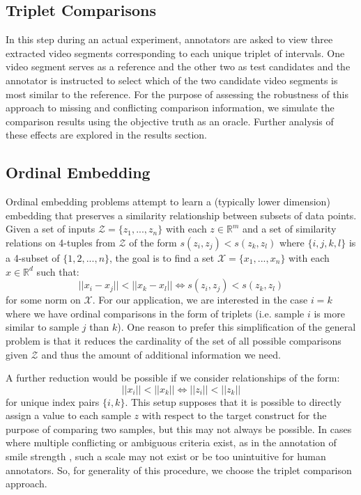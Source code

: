 \documentclass[times,twocolumn,final,authoryear]{elsarticle}
\begin{document}
\subsection{Triplet Comparisons}
In this step during an actual experiment, annotators are asked to view three extracted video segments corresponding to each unique triplet of intervals.  One video segment serves as a reference and the other two as test candidates and the annotator is instructed to select which of the two candidate video segments is most similar to the reference.  For the purpose of assessing the robustness of this approach to missing and conflicting comparison information, we simulate the comparison results using the objective truth as an oracle.  Further analysis of these effects are explored in the results section.

\subsection{Ordinal Embedding}
Ordinal embedding problems attempt to learn a (typically lower dimension) embedding that preserves a similarity relationship between subsets of data points.  Given a set of inputs $\mathcal{Z} = \{z_1,...,z_n\}$ with each $z \in \mathbb{R}^m$ and a set of similarity relations on 4-tuples from $\mathcal{Z}$ of the form $s(z_i,z_j) < s(z_k,z_l)$ where $\{i,j,k,l\}$ is a 4-subset of $\{1,2,...,n\}$, the goal is to find a set $\mathcal{X} = \{x_1,...,x_n\}$ with each $x \in \mathbb{R}^d$ such that:
\begin{equation*}
||x_i-x_j|| < ||x_k-x_l|| \Longleftrightarrow s(z_i,z_j) < s(z_k,z_l)
\end{equation*}
\noindent
for some norm on $\mathcal{X}$. For our application, we are interested in the case $i=k$ where we have ordinal comparisons in the form of triplets (i.e. sample $i$ is more similar to sample $j$ than $k$).  One reason to prefer this simplification of the general problem is that it reduces the cardinality of the set of all possible comparisons given $\mathcal{Z}$ and thus the amount of additional information we need.

A further reduction would be possible if we consider relationships of the form:
\begin{equation*}
||x_i|| < ||x_k|| \Longleftrightarrow ||z_i|| < ||z_k||
\end{equation*}
for unique index pairs $\{i,k\}$.  This setup supposes that it is possible to directly assign a value to each sample $z$ with respect to the target construct for the purpose of comparing two samples, but this may not always be possible.  In cases where multiple conflicting or ambiguous criteria exist, as in the annotation of smile strength \citep{Gupta2016}, such a scale may not exist or be too unintuitive for human annotators.  So, for generality of this procedure, we choose the triplet comparison approach.
\end{document}
